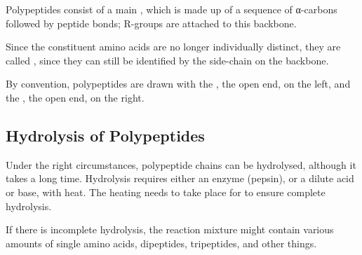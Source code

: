 			Polypeptides consist of a main , which is made up of a sequence of α-carbons followed by peptide bonds; R-groups
			are attached to this backbone.

			Since the constituent amino acids are no longer individually distinct, they are called , since they
			can still be identified by the side-chain on the backbone.

			By convention, polypeptides are drawn with the , the open  end, on the left, and the ,
			the open  end, on the right.



		\subsection{Hydrolysis of Polypeptides}

			Under the right circumstances, polypeptide chains can be hydrolysed, although it takes a long time. Hydrolysis requires either
			an enzyme (pepsin), or a dilute acid or base, with heat. The heating needs to take place for  to ensure
			complete hydrolysis.

			If there is incomplete hydrolysis, the reaction mixture might contain various amounts of single amino acids, dipeptides, tripeptides,
			and other things.
















